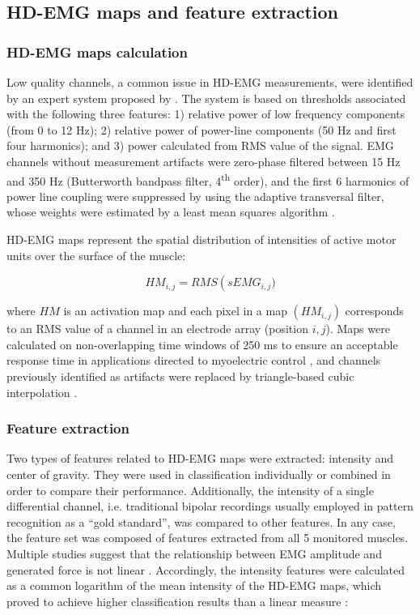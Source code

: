 \subsection{HD-EMG maps and feature extraction}
\subsubsection{HD-EMG maps calculation}
Low quality channels, a common issue in HD-EMG measurements, were identified by an expert system proposed by \citet{Rojas-Martinez2012}. The system is based on thresholds associated with the following three features: 1) relative power of low frequency components (from 0 to 12 Hz); 2) relative power of power-line components (50 Hz and first four harmonics); and 3) power calculated from RMS value of the signal. EMG channels without measurement artifacts were zero-phase filtered between 15 Hz and 350 Hz (Butterworth bandpass filter, 4\textsuperscript{th} order), and the first 6 harmonics of power line coupling were suppressed by using the adaptive transversal filter, whose weights were estimated by a least mean squares algorithm \citep{Mananas2001}.

HD-EMG maps represent the spatial distribution of intensities of active motor units over the surface of the muscle:

\begin{equation} \label{eq:1-1}
HM_{i,j} = RMS\left (sEMG_{i,j})\right.
\end{equation}

where $HM$ is an activation map and each pixel in a map $(HM_{i,j})$ corresponds to an RMS value of a channel in an electrode array (position $i,j$). Maps were calculated on non-overlapping time windows of 250 ms to ensure an acceptable response time in applications directed to myoelectric control \citep{Oskoei2007}, and channels previously identified as artifacts were replaced by triangle-based cubic interpolation \citep{Rojas-Martinez2012}.


\subsubsection{Feature extraction}
Two types of features related to HD-EMG maps were extracted: intensity and center of gravity. They were used in classification individually or combined in order to compare their performance. Additionally, the intensity of a single differential channel, i.e. traditional bipolar recordings usually employed in pattern recognition as a “gold standard”, was compared to other features. In any case, the feature set was composed of features extracted from all 5 monitored muscles.
Multiple studies suggest that the relationship between EMG amplitude and generated force is not linear \citep{Staudenmann2010, DeLuca1997}. Accordingly, the intensity features were calculated as a common logarithm of the mean intensity of the HD-EMG maps, which proved to achieve higher classification results than a linear measure \citep{Rojas-Martinez2013}:


